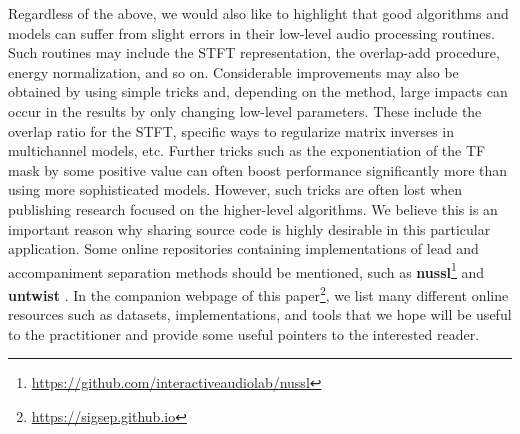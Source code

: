 Regardless of the above, we would also like to highlight that good algorithms and models can suffer from slight errors in their low-level audio processing routines. Such routines may include the STFT representation, the overlap-add procedure, energy normalization, and so on. Considerable improvements may also be obtained by using simple tricks and, depending on the method, large impacts can occur in the results by only changing low-level parameters. These include
the overlap ratio for the STFT, specific ways to regularize matrix inverses in multichannel models, etc. Further tricks such as the exponentiation of the TF mask by some positive value can often boost performance significantly more than using more sophisticated models. However, such tricks are often lost when publishing research focused on the higher-level algorithms. We believe this is an important reason why sharing source code is highly desirable in this particular application. Some online repositories containing implementations of lead and accompaniment separation methods should be mentioned, such as \textbf{nussl}\footnote{\url{https://github.com/interactiveaudiolab/nussl}} and \textbf{untwist} \cite{roma16}. In the companion webpage of this paper\footnote{\url{https://sigsep.github.io}}, we list many different online resources such as datasets, implementations, and tools that we hope will be useful to the practitioner and provide some useful pointers to the interested reader.

